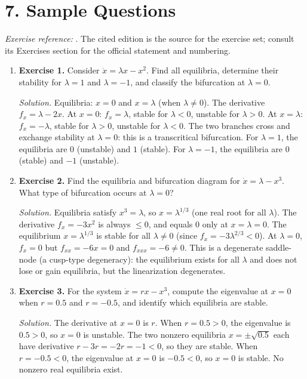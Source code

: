 \section*{7. Sample Questions}
\emph{Exercise reference:} \cite{bifurcation_theory_ref1}. The cited edition is the source for the exercise set; consult its Exercises section for the official statement and numbering.
\begin{enumerate}[leftmargin=*,itemsep=0.9em]

\item \textbf{Exercise 1.} Consider $\dot x=\lambda x-x^2$. Find all equilibria, determine their stability for $\lambda=1$ and $\lambda=-1$, and classify the bifurcation at $\lambda=0$.

\emph{Solution.} Equilibria: $x=0$ and $x=\lambda$ (when $\lambda\ne 0$). The derivative $f_x=\lambda-2x$. At $x=0$: $f_x=\lambda$, stable for $\lambda<0$, unstable for $\lambda>0$. At $x=\lambda$: $f_x=-\lambda$, stable for $\lambda>0$, unstable for $\lambda<0$. The two branches cross and exchange stability at $\lambda=0$: this is a transcritical bifurcation. For $\lambda=1$, the equilibria are $0$ (unstable) and $1$ (stable). For $\lambda=-1$, the equilibria are $0$ (stable) and $-1$ (unstable).

\item \textbf{Exercise 2.} Find the equilibria and bifurcation diagram for $\dot x=\lambda-x^3$. What type of bifurcation occurs at $\lambda=0$?

\emph{Solution.} Equilibria satisfy $x^3=\lambda$, so $x=\lambda^{1/3}$ (one real root for all $\lambda$). The derivative $f_x=-3x^2$ is always $\le 0$, and equals $0$ only at $x=\lambda=0$. The equilibrium $x=\lambda^{1/3}$ is stable for all $\lambda\ne 0$ (since $f_x=-3\lambda^{2/3}<0$). At $\lambda=0$, $f_x=0$ but $f_{xx}=-6x=0$ and $f_{xxx}=-6\ne 0$. This is a degenerate saddle-node (a cusp-type degeneracy): the equilibrium exists for all $\lambda$ and does not lose or gain equilibria, but the linearization degenerates.

\item \textbf{Exercise 3.} For the system $\dot x=r x-x^3$, compute the eigenvalue at $x=0$ when $r=0.5$ and $r=-0.5$, and identify which equilibria are stable.

\emph{Solution.} The derivative at $x=0$ is $r$. When $r=0.5>0$, the eigenvalue is $0.5>0$, so $x=0$ is unstable. The two nonzero equilibria $x=\pm\sqrt{0.5}$ each have derivative $r-3r=-2r=-1<0$, so they are stable. When $r=-0.5<0$, the eigenvalue at $x=0$ is $-0.5<0$, so $x=0$ is stable. No nonzero real equilibria exist.


\end{enumerate}
